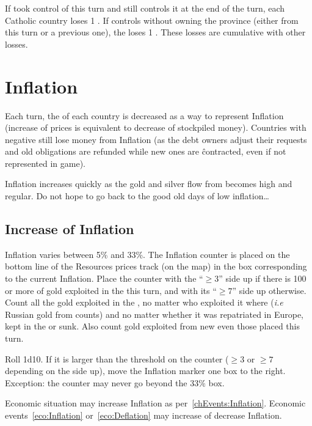 \aparag[\villeRoma]
\bparag If \TUR took control of \villeRoma this turn and still controls it at
the end of the turn, each Catholic country loses 1 \STAB.
\bparag If \TUR controls \villeRoma without owning the province (either from
this turn or a previous one), the \SDCF loses 1 \STAB.
\bparag These losses are cumulative with other losses.

\section{Inflation}\label{chPeace:Inflation}
\aparag Each turn, the \RT of each country is decreased as a way to represent
Inflation (increase of prices is equivalent to decrease of stockpiled money).
\bparag Countries with negative \RT still lose money from Inflation (as the
debt owners adjust their requests and old obligations are refunded while new
ones are ĉontracted, even if not represented in game).

\begin{designnote}
  Inflation increases quickly as the gold and silver flow from
  \continentAmerica becomes high and regular. Do not hope to go back to the
  good old days of low inflation\ldots
\end{designnote}

\subsection{Increase of Inflation}\label{chPeace:Increase Inflation}
\aparag Inflation varies between 5\% and 33\%. The Inflation counter is placed
on the bottom line of the Resources prices track (on the \ROTW map) in the box
corresponding to the current Inflation.
\bparag Place the counter with the ``$\geq 3$'' side up if there is 100\ducats
or more of gold exploited in the \ROTW this turn, and with its ``$\geq 7$''
side up otherwise.
\bparag Count all the gold exploited in the \ROTW, no matter who exploited it
where (\emph{i.e} Russian gold from \continentSiberia counts) and no matter
whether it was repatriated in Europe, kept in the \ROTW or sunk.
\bparag Also count gold exploited from new \COL even those placed this turn.

 Roll 1d10. If it is larger than the
threshold on the counter ($\geq 3$ or $\geq 7$ depending on the side up), move
the Inflation marker one box to the right.
\bparag Exception: the counter may never go beyond the 33\% box.

\bparag Economic situation may increase Inflation as
per~\ref{chEvents:Inflation}.
\bparag Economic events~\ref{eco:Inflation} or~\ref{eco:Deflation} may
increase of decrease Inflation.

